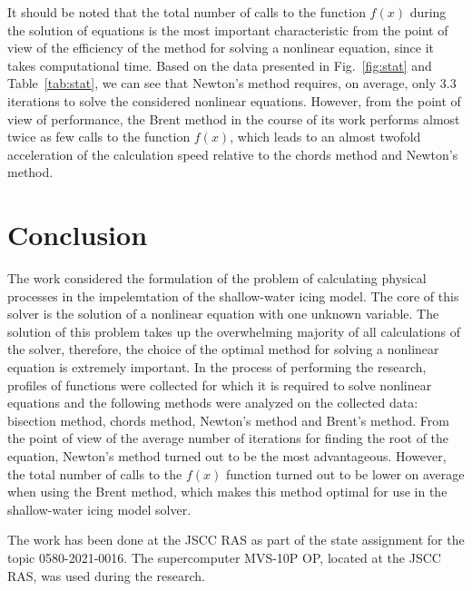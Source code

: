 \documentclass[
11pt,%
tightenlines,%
twoside,%
onecolumn,%
nofloats,%
nobibnotes,%
nofootinbib,%
superscriptaddress,%
noshowpacs,%
centertags]%
{revtex4}
\begin{document}
It should be noted that the total number of calls to the function $f(x)$ during the solution of equations is the most important characteristic from the point of view of the efficiency of the method for solving a nonlinear equation, since it takes computational time.
Based on the data presented in Fig.~\ref{fig:stat} and Table~\ref{tab:stat}, we can see that Newton's method requires, on average, only 3.3 iterations to solve the considered nonlinear equations.
However, from the point of view of performance, the Brent method in the course of its work performs almost twice as few calls to the function $f(x)$, which leads to an almost twofold acceleration of the calculation speed relative to the chords method and Newton's method.

\section{Conclusion}

The work considered the formulation of the problem of calculating physical processes in the impelemtation of the shallow-water icing model.
The core of this solver is the solution of a nonlinear equation with one unknown variable.
The solution of this problem takes up the overwhelming majority of all calculations of the solver, therefore, the choice of the optimal method for solving a nonlinear equation is extremely important.
In the process of performing the research, profiles of functions were collected for which it is required to solve nonlinear equations and the following methods were analyzed on the collected data: bisection method, chords method, Newton's method and Brent's method.
From the point of view of the average number of iterations for finding the root of the equation, Newton's method turned out to be the most advantageous.
However, the total number of calls to the $f(x)$ function turned out to be lower on average when using the Brent method, which makes this method optimal for use in the shallow-water icing model solver.
\begin{acknowledgments}
The work has been done at the JSCC RAS as part of the state assignment for the topic 0580-2021-0016.
The supercomputer MVS-10P OP, located at the JSCC RAS, was used during the research.
\end{acknowledgments}
\end{document}
